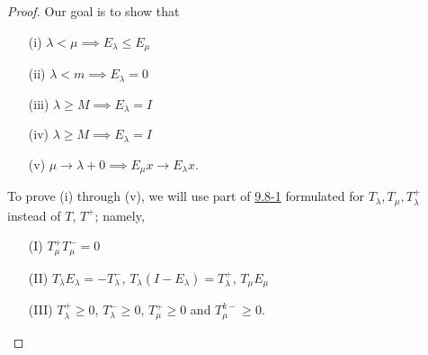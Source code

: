 \begin{proof}
Our goal is to show that 
\begin{enumerate}
    \item[(i)] \( \lambda < \mu \implies {E}_{\lambda} \leq {E}_{\mu } \)
    \item[(ii)] \( \lambda < m   \implies {E}_{\lambda} =  0 \) 
    \item[(iii)] \( \lambda \geq M  \implies {E}_{\lambda } =  I \) 
    \item[(iv)] \( \lambda \geq M  \implies {E}_{\lambda} = I  \)
    \item[(v)] \( \mu \to \lambda + 0  \implies {E}_{\mu}x \to {E}_{\lambda}x \). 
\end{enumerate}

To prove (i) through (v), we will use part of {\hyperref[9.8-1]{9.8-1}} formulated for \( {T}_{\lambda}, {T}_{\mu} , {T}_{\lambda}^{+} \) instead of \( T  \), \( T^{+} \); namely,  
\begin{enumerate}
    \item[(I)] \( {T}_{\mu }^{+} {T}_{\mu }^{-} = 0  \)
    \item[(II)] \( {T}_{\lambda} {E}_{\lambda} = - {T}_{\lambda}^{-}  \), \( {T}_{\lambda} (I - {E}_{\lambda}) = {T}_{\lambda}^{+} \), \( {T}_{\mu } {E}_{\mu} \)
    \item[(III)] \( {T}_{\lambda}^{+} \geq 0  \), \( {T}_{\lambda}^{-} \geq 0  \), \( {T}_{\mu }^{+} \geq 0  \) and \( {T}_{\mu }^{k-} \geq 0  \).
\end{enumerate}


\end{proof}
